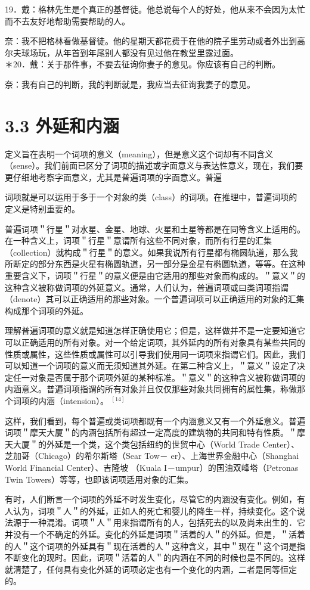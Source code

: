 19．戴：格林先生是个真正的基督徒。他总说每个人的好处，他从来不会因为太忙而不去友好地帮助需要帮助的人。

奈：我不把格林看做基督徒。他的星期天都花费于在他的院子里劳动或者外出到高尔夫球场玩，从年首到年尾别人都没有见过他在教堂里露过面。\\
＊20．戴：关于那件事，不要去征询你妻子的意见。你应该有自己的判断。

奈：我有自己的判断，我的判断就是，我应当去征询我妻子的意见。

\section*{3.3 外延和内涵}
定义旨在表明一个词项的意义（meaning），但是意义这个词却有不同含义（sense）。我们前面已区分了词项的描述或字面意义与表达性意义，现在，我们要更仔细地考察字面意义，尤其是普遍词项的字面意义。普遍

词项就是可以运用于多于一个对象的类（class）的词项。在推理中，普遍词项的定义是特别重要的。

普遍词项＂行星＂对水星、金星、地球、火星和土星等都是在同等含义上适用的。在一种含义上，词项＂行星＂意谓所有这些不同对象，而所有行星的汇集（collection）就构成＂行星＂的意义。如果我说所有行星都有椭圆轨道，那么我所断定的部分东西是火星有椭圆轨道，另一部分是金星有椭圆轨道，等等。在这种重要含义下，词项＂行星＂的意义便是由它适用的那些对象而构成的。＂意义＂的这种含义被称做词项的外延意义。通常，人们认为，普遍词项或曰类词项指谓（denote）其可以正确适用的那些对象。一个普遍词项可以正确适用的对象的汇集构成那个词项的外延。

理解普遍词项的意义就是知道怎样正确使用它；但是，这样做并不是一定要知道它可以正确适用的所有对象。对一个给定词项，其外延内的所有对象具有某些共同的性质或属性，这些性质或属性可以引导我们使用同一词项来指谓它们。因此，我们可以知道一个词项的意义而无须知道其外延。在第二种含义上，＂意义＂设定了决定任一对象是否属于那个词项外延的某种标准。＂意义＂的这种含义被称做词项的内涵意义。普遍词项指谓的所有对象并且仅仅那些对象共同拥有的属性集，称做那个词项的内涵（intension）。 ${ }^{[14]}$

这样，我们看到，每个普遍或类词项都既有一个内涵意义又有一个外延意义。普遍词项＂摩天大厦＂的内涵包括所有超过一定高度的建筑物的共同和特有性质。＂摩天大厦＂的外延是一个类，这个类包括纽约的世贸中心（World Trade Center）、芝加哥（Chicago）的希尔斯塔（Sear Tow－ er）、上海世界金融中心（Shanghai World Financial Center）、吉隆坡 （Kuala I－umpur）的国油双峰塔（Petronas Twin Towers）等等，也即该词项适用对象的汇集。

有时，人们断言一个词项的外延不时发生变化，尽管它的内涵没有变化。例如，有人认为，词项＂人＂的外延，正如人的死亡和婴儿的降生一样，持续变化。这个说法源于一种混淆。词项＂人＂用来指谓所有的人，包括死去的以及尚未出生的．它并没有一个不确定的外延。变化的外延是词项＂活着的人＂的外延。但是，＂活着的人＂这个词项的外延具有＂现在活着的人＂这种含义，其中＂现在＂这个词是指不断变化的现时。因此，词项＂活着的人＂的内涵在不同的时候也是不同的。这样就清楚了，任何具有变化外延的词项必定也有一个变化的内涵，二者是同等恒定的。

